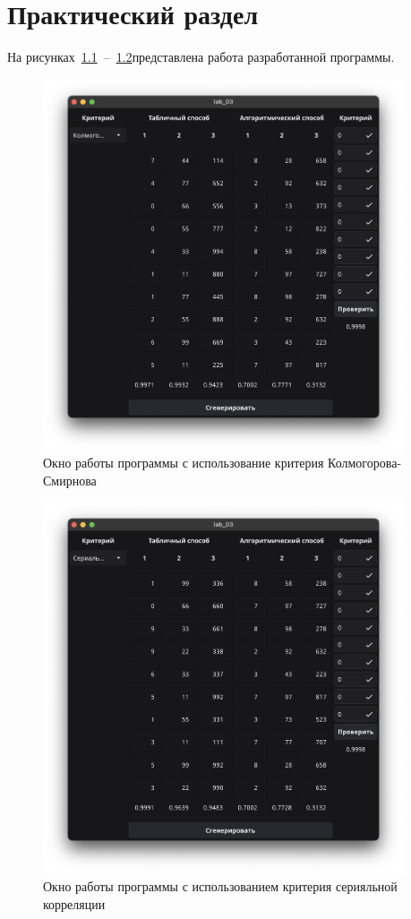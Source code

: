 \chapter{Практический раздел}

На рисунках~\ref{fig:1}~--~\ref{fig:2}представлена работа разработанной программы.

\begin{figure}[ht]
    \centering
    \includegraphics[width=0.95\textwidth]{assets/1.jpeg}
    \caption{Окно работы программы с использование критерия Колмогорова-Смирнова}
    \label{fig:1}
\end{figure}

\begin{figure}[ht]
    \centering
    \includegraphics[width=0.95\textwidth]{assets/2.jpeg}
    \caption{Окно работы программы с использованием критерия серияльной корреляции}
    \label{fig:2}
\end{figure}